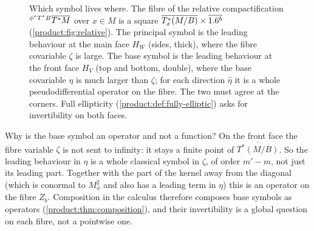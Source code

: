 \begin{figure}[ht]
\centering
{}
\caption{Which symbol lives where. The fibre of the relative compactification
${}^{\phi^*T^*B}\overline{T^*M}$ over $x\in M$ is a square
$\overline{T^*_x(M/B)}\times\overline{1.6^b}$ (\cref{product:fig:relative}). The
principal symbol is the leading behaviour at the main face $H_W$ (sides, thick),
where the fibre covariable $\zeta$ is large. The base symbol is the leading
behaviour at the front face $H_V$ (top and bottom, double), where the base
covariable $\eta$ is much larger than $\zeta$; for each direction $\hat\eta$ it is
a whole pseudodifferential operator on the fibre. The two must agree at the
corners. Full ellipticity (\cref{product:def:fully-elliptic}) asks for
invertibility on both faces.}
\label{product:fig:symbols}
\end{figure}

\begin{discussion}
  Why is the base symbol an operator and not a function? On the front face the
  fibre variable $\zeta$ is not sent to infinity: it stays a finite point of
  $\overline{T^*(M/B)}$. So the leading behaviour in $\eta$ is a whole classical
  symbol in $\zeta$, of order $m'-m$, not just its leading part. Together with the
  part of the kernel away from the diagonal (which is conormal to $M^2_\phi$ and
  also has a leading term in $\eta$) this is an operator on the fibre $Z_b$.
  Composition in the calculus therefore composes base symbols as operators
  (\cref{product:thm:composition}), and their invertibility is a global question
  on each fibre, not a pointwise one.
\end{discussion}

